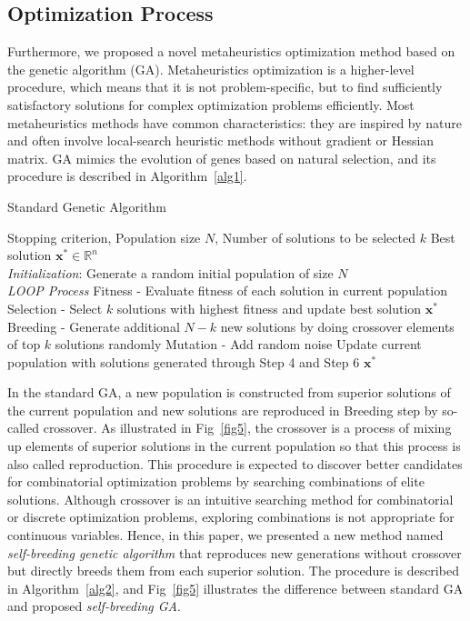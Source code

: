 \documentclass[10pt,letterpaper]{article}
\begin{document}
\subsection*{Optimization Process}
Furthermore, we proposed a novel metaheuristics optimization method based on the genetic algorithm (GA). Metaheuristics optimization is a higher-level procedure, which means that it is not problem-specific, but to find sufficiently satisfactory solutions for complex optimization problems efficiently. Most metaheuristics methods have common characteristics: they are inspired by nature and often involve local-search heuristic methods without gradient or Hessian matrix. GA mimics the evolution of genes based on natural selection, and its procedure is described in Algorithm~\ref{alg1}.
\begin{algorithm}[!ht]
    \caption{Standard Genetic Algorithm}
    \begin{algorithmic}[1]
        \renewcommand{\algorithmicrequire}{\textbf{Input:}}
        \renewcommand{\algorithmicensure}{\textbf{Output:}}
        \REQUIRE Stopping criterion, Population size $N$, Number of solutions to be selected $k$
        \ENSURE Best solution $\mathbf{x^*} \in \mathbb{R}^n$
        \\ \textit{Initialization}:
        \STATE Generate a random initial population of size $N$
        \\ \textit{LOOP Process}
        \STATE Fitness - Evaluate fitness of each solution in current population
        \STATE Selection - Select $k$ solutions with highest fitness and update best solution $\mathbf{x^{*}}$
        \STATE Breeding - Generate additional $N-k$ new solutions by doing crossover elements of top $k$ solutions randomly
        \STATE Mutation - Add random noise 
        \STATE Update current population with solutions generated through Step 4 and Step 6
        \ENDWHILE
        \RETURN $\mathbf{x^{*}}$ 
    \end{algorithmic}
    \label{alg1}
\end{algorithm}

In the standard GA, a new population is constructed from superior solutions of the current population and new solutions are reproduced in Breeding step by so-called crossover. As illustrated in Fig~\ref{fig5}, the crossover is a process of mixing up elements of superior solutions in the current population so that this process is also called reproduction. This procedure is expected to discover better candidates for combinatorial optimization problems by searching combinations of elite solutions. Although crossover is an intuitive searching method for combinatorial or discrete optimization problems, exploring combinations is not appropriate for continuous variables. Hence, in this paper, we presented a new method named \textit{self-breeding genetic algorithm} that reproduces new generations without crossover but directly breeds them from each superior solution. The procedure is described in Algorithm~\ref{alg2}, and Fig~\ref{fig5} illustrates the difference between standard GA and proposed \textit{self-breeding GA}.
\end{document}

